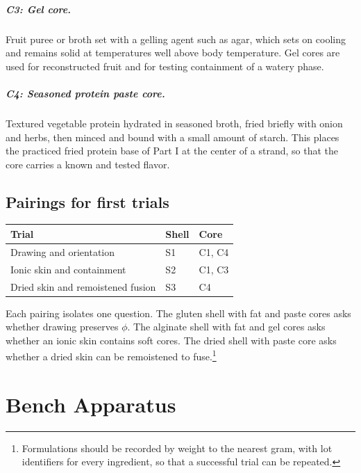 \documentclass[11pt,openany]{book}
\theoremstyle{definition}
\begin{document}
\paragraph{C3: Gel core.} Fruit puree or broth set with a gelling agent such as agar, which sets on cooling and remains solid at temperatures well above body temperature. Gel cores are used for reconstructed fruit and for testing containment of a watery phase.

\paragraph{C4: Seasoned protein paste core.} Textured vegetable protein hydrated in seasoned broth, fried briefly with onion and herbs, then minced and bound with a small amount of starch. This places the practiced fried protein base of Part I at the center of a strand, so that the core carries a known and tested flavor.

\section{Pairings for first trials}

\begin{center}
\begin{tabular}{@{}lll@{}}
\toprule
Trial & Shell & Core \\
\midrule
Drawing and orientation & S1 & C1, C4 \\
Ionic skin and containment & S2 & C1, C3 \\
Dried skin and remoistened fusion & S3 & C4 \\
\bottomrule
\end{tabular}
\end{center}

Each pairing isolates one question. The gluten shell with fat and paste cores asks whether drawing preserves $\phi$. The alginate shell with fat and gel cores asks whether an ionic skin contains soft cores. The dried shell with paste core asks whether a dried skin can be remoistened to fuse.\footnote{Formulations should be recorded by weight to the nearest gram, with lot identifiers for every ingredient, so that a successful trial can be repeated.}

\chapter{Bench Apparatus}\label{ch:bench}
\end{document}
